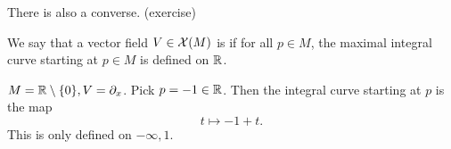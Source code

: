 \begin{remark}
    There is also a converse. (exercise)
\end{remark}

\begin{definition*}
    We say that a vector field \(V\in \mathcal{X}(M)\) is  if for all 
    \(p\in M\), the maximal integral curve starting at \(p\in M\) is defined on \(\mathbb{R}\).
\end{definition*}

\begin{example}
    \(M=\mathbb{R}\setminus\{0\},V=\partial_x\). Pick \(p=-1\in \mathbb{R}\). Then the integral curve starting at 
    \(p\) is the map
    \[t\mapsto -1 +t.\]
    This is only defined on \(-\infty,1\).
\end{example}





